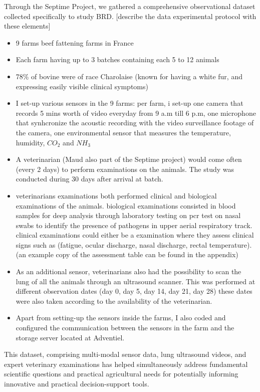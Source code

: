 Through the Septime Project, we gathered a comprehensive observational dataset collected specifically to study BRD. [describe the data experimental protocol with these elements]
\begin{itemize}
    \item 9 farms beef fattening farms in France
    \item Each farm having up to 3 batches containing each 5 to 12 animals
    \item 78\% of bovine were of race Charolaise (known for having a white fur, and expressing  easily visible clinical symptoms)
    \item I set-up various sensors in the 9 farms: per farm, i set-up one camera that records 5 mins worth of video everyday from 9 a.m till 6 p.m, one microphone that synhcronize the acoustic recording with the video surveillance footage of the camera, one environmental sensor that measures the temperature, humidity, $CO_2$ and $NH_3$
    \item A veterinarian (Maud also part of the Septime project) would come often (every 2 days) to perform examinations on the animals. The study was conducted during 30 days after arrival at batch.
    \item veterinarians examinations both performed clinical and biological examinations of the animals. biological examinations consisted in blood samples for deep analysis through laboratory testing on pcr test on nasal swabs to identify the presence of pathogens in upper aerial respiratory track. clinical examinations could either be a  examination where they assess clinical signs such as (fatigue, ocular discharge, nasal discharge, rectal temperature). (an example copy of the assessment table can be found in the appendix) 
    \item As an additional sensor, veterinarians also had the possibility to scan the lung of all the animals through an ultrasound scanner. This was performed at different observation dates (day 0, day 5, day 14, day 21, day 28) these dates were also taken according to the availability of the veterinarian. 
    \item Apart from setting-up the sensors inside the farms, I also coded and configured the communication between the sensors in the farm and the storage server located at Adventiel.
\end{itemize}


This dataset, comprising multi-modal sensor data, lung ultrasound videos, and expert veterinary examinations has helped simultaneously address fundamental scientific questions and practical agricultural needs for potentially informing innovative and practical decision-support tools.
 

